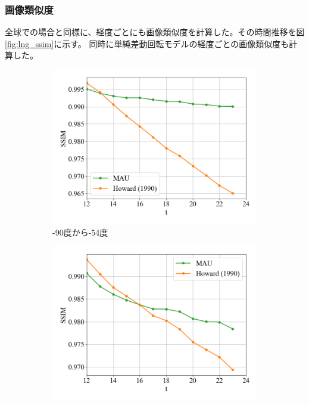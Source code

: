         \subsubsection{画像類似度}
          全球での場合と同様に、経度ごとにも画像類似度を計算した。その時間推移を図\ref{fig:lng_ssim}に示す。
          同時に単純差動回転モデルの経度ごとの画像類似度も計算した。
          \begin{figure}[htbp]
            \begin{subfigure}{0.5\textwidth}
              \centering
              \includegraphics[width=\textwidth]{figures/exp2/lng_ssim_1.png}
              \caption{-90度から-54度}
            \end{subfigure}
            \begin{subfigure}{0.5\textwidth}
              \centering
              \includegraphics[width=\textwidth]{figures/exp2/lng_ssim_2.png}

\end{subfigure}
\end{figure}
